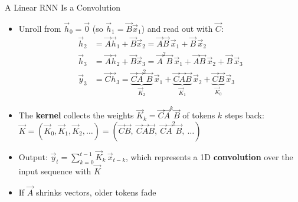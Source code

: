 \documentclass[11pt,compress,t,notes=noshow, xcolor=table]{beamer}
\begin{document}

\begin{frame}{A Linear RNN Is a Convolution}

\vfill

\begin{itemize}
  \item Unroll from $\vec h_0 = \vec 0$ (so $\vec h_1 = \vec B \vec x_1$) and read out with $\vec C$:
        \begin{align*}
          \vec h_2 &= \vec A \vec h_1 + \vec B \vec x_2 = \vec A \vec B\, \vec x_1 + \vec B\, \vec x_2\\
          \vec h_3 &= \vec A \vec h_2 + \vec B \vec x_3 = \vec A^2 \vec B\, \vec x_1 + \vec A \vec B\, \vec x_2 + \vec B\, \vec x_3\\
          \vec y_3 &= \vec C \vec h_3 = \underbrace{\vec C \vec A^2 \vec B}_{\vec K_2}\, \vec x_1 + \underbrace{\vec C \vec A \vec B}_{\vec K_1}\, \vec x_2 + \underbrace{\vec C \vec B}_{\vec K_0}\, \vec x_3
        \end{align*}
   \item The \textbf{kernel} collects the weights $\vec K_k = \vec C \vec A^k \vec B$ of tokens $k$ steps back:
        $\vec K = (\vec K_0, \vec K_1, \vec K_2, \ldots) = (\vec C \vec B,\ \vec C \vec A \vec B,\ \vec C \vec A^2 \vec B,\ \ldots)$
  \item Output: $\vec y_t = \sum_{k=0}^{t-1} \vec K_k\, \vec x_{t-k}$, which represents a 1D \textbf{convolution} over the input sequence with $\vec K$
  \item If $\vec A$ shrinks vectors, older tokens fade
\end{itemize}


\begin{center}
\end{center}

\vfill

\end{frame}
\end{document}

